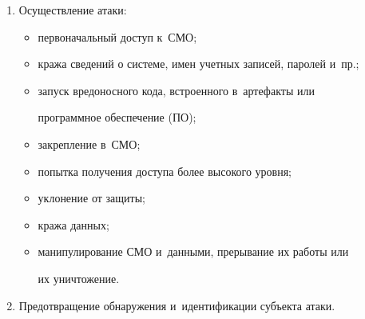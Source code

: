 \begin{enumerate}[1.]
\item Осуществление атаки: 

\begin{itemize}

\item[(а)] первоначальный доступ к~СМО;

\item[(б)] кража сведений о системе, имен учетных записей, паролей и~пр.;

\item[(в)] запуск вредоносного кода, встроенного в~артефакты или 

программное обеспечение (ПО);

\item[(г)] закрепление в~СМО;

\item[(д)] попытка получения доступа более высокого уровня;

\item[(е)] уклонение от защиты;

\item[(ж)] кража данных;

\item[(з)] манипулирование СМО и~данными, прерывание их работы или 

их уничтожение.

\end{itemize}

\item Предотвращение обнаружения и~идентификации субъекта атаки.

\end{enumerate}



